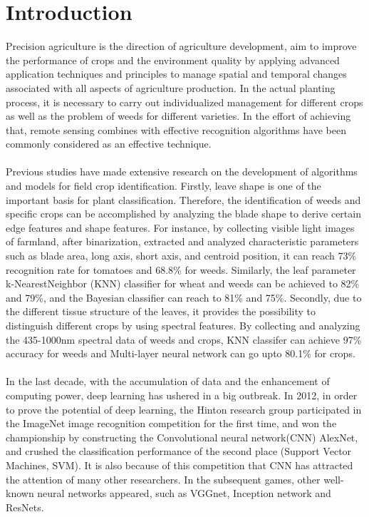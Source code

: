 \documentclass[11pt]{article}
\begin{document}
\section{Introduction}
Precision agriculture is the direction of agriculture development, aim to improve the performance of crops and the environment quality by applying advanced application techniques and principles to manage spatial and temporal changes associated with all aspects of agriculture production.\citep{pierce1999aspects} In the actual planting process, it is necessary to carry out individualized management for different crops as well as the problem of weeds for different varieties. In the effort of achieving that, remote sensing combines with effective recognition algorithms have been commonly considered as an effective technique.
\\
\\
Previous studies have made extensive research on the development of algorithms and models for field crop identification. Firstly, leave shape is one of the important basis for plant classification. Therefore, the identification of weeds and specific crops can be accomplished by analyzing the blade shape to derive certain edge features and shape features. For instance, by collecting visible light images of farmland, after binarization, extracted and analyzed characteristic parameters such as blade area, long axis, short axis, and centroid position, it can reach 73\% recognition rate for tomatoes and 68.8\% for weeds\citep{lee1999robotic}. Similarly, the leaf parameter k-NearestNeighbor (KNN) classifier for wheat and weeds can be achieved to 82\% and 79\%, and the Bayesian classifier can reach to 81\% and 75\%\citep{perez2000colour}. Secondly, due to the different tissue structure of the leaves, it provides the possibility to distinguish different crops by using spectral features. By collecting and analyzing the 435-1000nm spectral data of weeds and crops, KNN classifer can achieve 97\% accuracy for weeds and Multi-layer neural network can go upto 80.1\% for crops\citep{feyaerts2001multi}.
\\
\\
In the last decade, with the accumulation of data and the enhancement of computing power, deep learning has ushered in a big outbreak. In 2012, in order to prove the potential of deep learning, the Hinton research group participated in the ImageNet image recognition competition for the first time, and won the championship by constructing the Convolutional neural network(CNN) AlexNet\citep{krizhevsky2012imagenet}, and crushed the classification performance of the second place (Support Vector Machines, SVM). It is also because of this competition that CNN has attracted the attention of many other researchers. In the subsequent games, other well-known neural networks appeared, such as VGGnet, Inception network and ResNets. 
\end{document}
